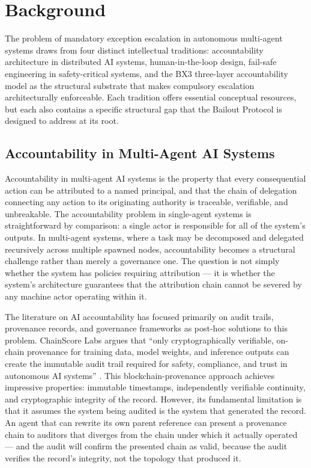 \section{Background}\label{sec:background}

The problem of mandatory exception escalation in autonomous multi-agent systems draws from four distinct intellectual traditions: accountability architecture in distributed AI systems, human-in-the-loop design, fail-safe engineering in safety-critical systems, and the BX3 three-layer accountability model as the structural substrate that makes compulsory escalation architecturally enforceable. Each tradition offers essential conceptual resources, but each also contains a specific structural gap that the Bailout Protocol is designed to address at its root.

\subsection{Accountability in Multi-Agent AI Systems}\label{sec:accountability}

Accountability in multi-agent AI systems is the property that every consequential action can be attributed to a named principal, and that the chain of delegation connecting any action to its originating authority is traceable, verifiable, and unbreakable. The accountability problem in single-agent systems is straightforward by comparison: a single actor is responsible for all of the system's outputs. In multi-agent systems, where a task may be decomposed and delegated recursively across multiple spawned nodes, accountability becomes a structural challenge rather than merely a governance one. The question is not simply whether the system has policies requiring attribution --- it is whether the system's architecture guarantees that the attribution chain cannot be severed by any machine actor operating within it.

The literature on AI accountability has focused primarily on audit trails, provenance records, and governance frameworks as post-hoc solutions to this problem. ChainScore Labs argues that ``only cryptographically verifiable, on-chain provenance for training data, model weights, and inference outputs can create the immutable audit trail required for safety, compliance, and trust in autonomous AI systems'' \cite{on_chain_provenance_ai}. This blockchain-provenance approach achieves impressive properties: immutable timestamps, independently verifiable continuity, and cryptographic integrity of the record. However, its fundamental limitation is that it assumes the system being audited is the system that generated the record. An agent that can rewrite its own parent reference can present a provenance chain to auditors that diverges from the chain under which it actually operated --- and the audit will confirm the presented chain as valid, because the audit verifies the record's integrity, not the topology that produced it.

